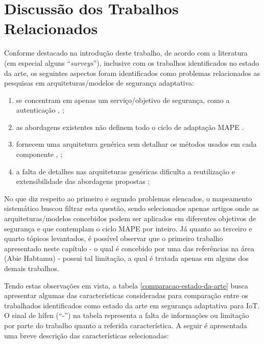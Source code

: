 \documentclass[tid,table]{texufpel} %
\begin{document}
\section{Discussão dos Trabalhos Relacionados}

Conforme destacado na introdução deste trabalho, de acordo com a literatura (em especial alguns ``\textit{surveys}''), inclusive com os trabalhos identificados no estado da arte, os seguintes aspectos foram identificados como problemas relacionados as pesquisas em arquiteturas/modelos de segurança adaptativa:

\begin{enumerate}
\item  se concentram em apenas um serviço/objetivo de segurança, como a autenticação \cite{aman14}, \cite{elkhodary07};
\item as abordagens existentes não definem todo o ciclo de adaptação MAPE \cite{yuan12}.
\item fornecem uma arquitetura genérica sem detalhar os métodos usados em cada componente  \cite{aman14}, \cite{yuan12};
\item a falta de detalhes nas arquiteturas genéricas dificulta a reutilização e extensibilidade das abordagens propostas \cite{yuan12};
\end{enumerate}

No que diz respeito ao primeiro e segundo problemas elencados, o mapeamento sistemático buscou filtrar esta questão, sendo selecionados apenas artigos onde as arquiteturas/modelos concebidos podem ser aplicados em diferentes objetivos de segurança e que contemplam o ciclo MAPE por inteiro. Já quanto ao terceiro e quarto tópicos levantados, é possível observar que o primeiro trabalho apresentado neste capítulo \cite{habtamu12} - o qual é concebido por uma das referências na área (Abie Habtamu) - possui tal limitação, a qual é tratada apenas em alguns dos demais trabalhos.

Tendo estas observações em vista, a tabela \ref{comparacao-estado-da-arte} busca apresentar algumas das características consideradas para comparação entre os trabalhados identificados como estado da arte em segurança adaptativa para IoT. O sinal de hífen (``-'') na tabela representa a falta de informações ou limitação por parte do trabalho quanto a referida característica. A seguir é apresentada uma breve descrição das características selecionadas:
\end{document}
